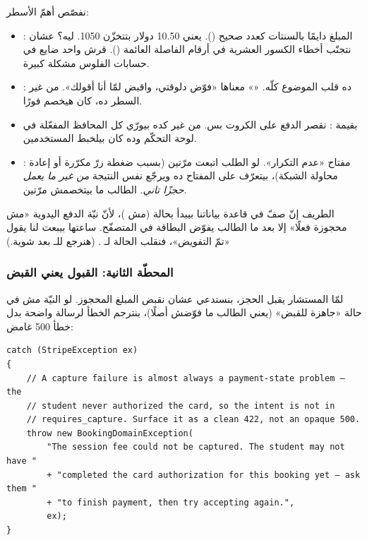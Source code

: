 نفصّص أهمّ الأسطر:
\begin{itemize}
\item {}: المبلغ دايمًا بالسنتات كعدد صحيح
  (). يعني 10.50 دولار بتتخزّن 1050. ليه؟ عشان نتجنّب أخطاء
  الكسور العشرية في أرقام الفاصلة العائمة (). قرش واحد
  ضايع في حسابات الفلوس مشكلة كبيرة.
\item {}: ده قلب الموضوع كلّه. «» معناها
  «فوّض دلوقتي، واقبض لمّا أنا أقولك». من غير السطر ده،  كان هيخصم
  فورًا.
\item {} بقيمة : نقصر الدفع على الكروت بس. من
  غير كده  بيورّي كل المحافظ المفعّلة في لوحة التحكّم وده كان بيلخبط
  المستخدمين.
\item {}: مفتاح «عدم التكرار». لو الطلب اتبعت مرّتين (بسبب
  ضغطة زرّ مكرّرة أو إعادة محاولة الشبكة)،  بيتعرّف على المفتاح ده
  ويرجّع نفس النتيجة \emph{من غير ما يعمل حجزًا تاني}. الطالب ما بيتخصمش مرّتين.
\end{itemize}

الطريف إنّ صفّ  في قاعدة بياناتنا بيبدأ بحالة  (مش
)، لأنّ نيّة الدفع اليدوية «مش محجوزة فعلًا» إلا بعد ما الطالب يفوّض
البطاقة في المتصفّح. ساعتها  بيبعت لنا  يقول «تمّ التفويض»،
فنقلب الحالة لـ . (هنرجع للـ  بعد شوية.)

\subsubsection{المحطّة الثانية: القبول يعني القبض}

لمّا المستشار يقبل الحجز، بنستدعي  عشان نقبض
المبلغ المحجوز. لو النيّة مش في حالة «جاهزة للقبض» (يعني الطالب ما فوّضش أصلًا)،
بنترجم الخطأ لرسالة واضحة بدل خطأ 500 غامض:

\begin{english}
\begin{lstlisting}[language={[Sharp]C}]
catch (StripeException ex)
{
    // A capture failure is almost always a payment-state problem — the
    // student never authorized the card, so the intent is not in
    // requires_capture. Surface it as a clean 422, not an opaque 500.
    throw new BookingDomainException(
        "The session fee could not be captured. The student may not have "
        + "completed the card authorization for this booking yet — ask them "
        + "to finish payment, then try accepting again.",
        ex);
}
\end{lstlisting}
\end{english}


